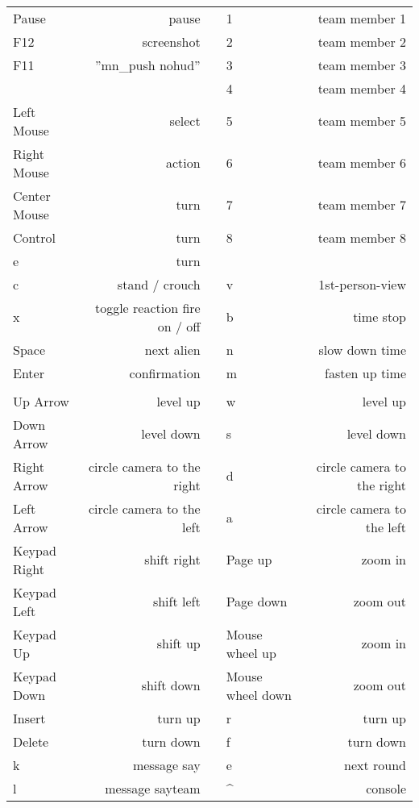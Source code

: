 \paragraph*{}
\begin{tabular}{|lrclr|}
\hline 
Pause 							 & pause  					 			&  & 1 & team member 1	\\ 
F12 								 & screenshot  						&  & 2 & team member 2	\\ 
F11 								 & ''mn_push nohud'' 				&  & 3 & team member 3	\\ 
 									 & 								 			&  & 4 & team member 4	\\  
Left Mouse				 	 & select									&  & 5 & team member 5	\\ 
Right Mouse  				 & action						 			&  & 6 & team member 6	\\ 
Center Mouse 			  	 & turn								 		&  & 7 & team member 7	\\ 
Control 						 & turn 									&  & 8 & team member 8 	\\ 
e									 &	 turn										&  & 	&								\\ 
c									 &  stand / crouch		 			&  & v	&	1st-person-view 	\\ 
x 									 & toggle reaction fire on / off &  & b	& time stop				\\ 
Space 							 & next alien 							&  & n 	& slow down time 	\\ 
Enter 							 & confirmation 						&  & m & fasten up time 	\\ 
 									 &  											&  &  	&  							\\ 
Up Arrow 						 & level up 								&  & w 	& level up 				\\ 
Down Arrow 					 & level down  							&  & s 	& level down 			\\ 
Right Arrow 					 & circle camera to the right 	&  & d 	& circle camera to the right 				\\ 
Left Arrow 					 & circle camera to the left 		&  & a  & circle camera to the left 					\\ 
Keypad Right 				 & shift right 							&  & Page up 					& zoom in  				\\ 
Keypad Left 					 & shift left  								&  & Page down 				& zoom out 			\\ 
Keypad Up 					 & shift up 								&  & Mouse wheel up 		& zoom in 				\\ 
Keypad Down 				 & shift down 							&  & Mouse wheel down & zoom out  			\\ 
Insert 							 & turn up 								&  & r 								& turn up					\\
Delete 							 & turn down 							&  & f 								& turn down 			\\
k  									 & message say 						&  & e 								& next round			\\
l 									 & message sayteam 				&  &  \^							& 	console			 	\\
\hline
\end{tabular} 

